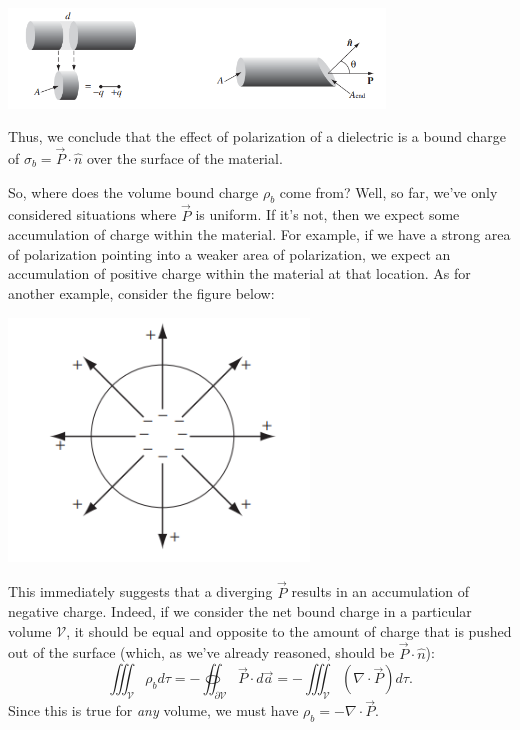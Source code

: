 \begin{center}
    \includegraphics[width=10cm]{Electrodynamics/tex/fig4.12-13.PNG}
\end{center}

Thus, we conclude that the effect of polarization of a dielectric is a bound charge of $\sigma_b=\vec{P}\cdot\hat{n}$ over the surface of the material.

So, where does the volume bound charge $\rho_b$ come from? Well, so far, we've only considered situations where $\vec{P}$ is uniform. If it's not, then we expect some accumulation of charge within the material. For example, if we have a strong area of polarization pointing into a weaker area of polarization, we expect an accumulation of positive charge within the material at that location. As for another example, consider the figure below:

\begin{center}
    \includegraphics[width=8cm]{Electrodynamics/images/fig4.14.PNG}
\end{center}

This immediately suggests that a diverging $\vec{P}$ results in an accumulation of negative charge. Indeed, if we consider the net bound charge in a particular volume $\mathcal{V}$, it should be equal and opposite to the amount of charge that is pushed out of the surface (which, as we've already reasoned, should be $\vec{P}\cdot\hat{n}$):
\[\iiint_{\mathcal{V}}\rho_bd\tau=-\oiint_{\partial\mathcal{V}}\vec{P}\cdot d\vec{a}=-\iiint_{\mathcal{V}}(\nabla\cdot \vec{P})d\tau.\]
Since this is true for \textit{any} volume, we must have $\rho_b=-\nabla\cdot \vec{P}$.

